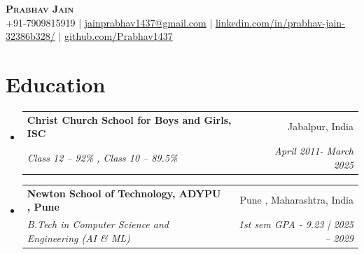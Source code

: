 \documentclass[letterpaper,11pt]{article}
\makeatletter
\newcommand{\resumeSubheading}[4]{
  \vspace{-2pt}\item
    \begin{tabular*}{0.97\textwidth}[t]{l@{\extracolsep{\fill}}r}
      \textbf{#1} & #2 \\
      \textit{\small#3} & \textit{\small #4} \\
    \end{tabular*}\vspace{-7pt}
}
\newcommand{\resumeSubHeadingListStart}{\begin{itemize}[leftmargin=0.15in, label={}]}
\newcommand{\resumeSubHeadingListEnd}{\end{itemize}}
\makeatother
\begin{document}
\begin{center}
    \textbf{\Huge \scshape Prabhav Jain} \\ \vspace{1pt}
    \small +91-7909815919 $|$ \href{mailto:prabhavjainofficial@gmail.com}{\underline{jainprabhav1437@gmail.com}} $|$ 
    \href{linkedin.com/in/prabhav-jain-32386b328/}{\underline{linkedin.com/in/prabhav-jain-32386b328/}} $|$
    \href{https://github.com/Prabhav1437}{\underline{github.com/Prabhav1437}}
\end{center}

\section{Education}
  \resumeSubHeadingListStart
    \resumeSubheading
      {Christ Church School for Boys and Girls, ISC}{Jabalpur, India}
      {Class 12 – 92\% , Class 10 – 89.5\%}{April 2011- March 2025}{}
    \resumeSubheading
      {Newton School of Technology, ADYPU , Pune}{Pune , Maharashtra, India}
      {B.Tech in Computer Science and Engineering (AI \& ML)}{1st sem GPA - 9.23 | 2025 -- 2029}
  \resumeSubHeadingListEnd
\end{document}
